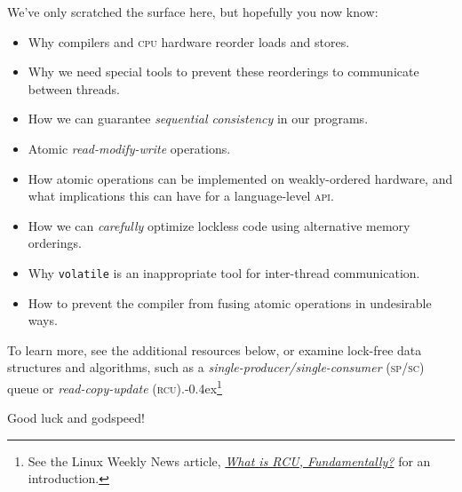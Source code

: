 \documentclass[fontsize=10pt, numbers=endperiod]{scrartcl}
\newcommand{\punckern}{\kern-0.4ex}
\newcommand{\monobox}[1]{\mbox{\texttt{#1}}}
\newcommand{\keyword}[1]{\monobox{\color{darkGreen}#1}}
\newcommand{\introduce}[1]{\textit{#1}}
\begin{document}
\begin{multicols*}{2}
We've only scratched the surface here,
but hopefully you now know:
\begin{itemize}
\item Why compilers and \textsc{cpu} hardware reorder loads and stores.
\item Why we need special tools to prevent these reorderings
    to communicate between threads.
\item How we can guarantee \introduce{sequential consistency} in our programs.
\item Atomic \introduce{read-modify-write} operations.
\item How atomic operations can be implemented on weakly-ordered hardware,
    and what implications this can have for a language-level \textsc{api}.
\item How we can \emph{carefully} optimize lockless code using alternative
    memory orderings.
\item Why \keyword{volatile} is an inappropriate tool for inter-thread
    communication.
\item How to prevent the compiler from fusing atomic operations in undesirable
    ways.
\end{itemize}
To learn more, see the additional resources below,
or examine lock-free data structures and algorithms,
such as a \introduce{single-producer/single-consumer}
\textsc{(sp/sc)} queue or \introduce{read-copy-update}
\textsc{(rcu)}.\punckern\footnote{See the Linux Weekly News article,
\href{https://lwn.net/Articles/262464/}{\textit{What is RCU, Fundamentally?}}
for an introduction.}

\vspace{\baselineskip}
\noindent Good luck and godspeed!
\end{multicols*}
\newpage

\appendix
\setcounter{secnumdepth}{0}
\end{document}
